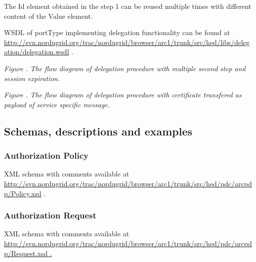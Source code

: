 \documentclass{article}
\newcommand\textstyleInternetlink[1]{\textcolor[rgb]{0.0,0.0,0.5019608}{#1}}
\newcounter{Figure}
\renewcommand\theFigure{\arabic{Figure}}
\begin{document}
{\color{black}
The Id element obtained in the step 1 can be reused multiple times with
different content of the Value element.}

{\color{black}
WSDL of portType implementing delegation functionality can be found at
\url{http://svn.nordugrid.org/trac/nordugrid/browser/arc1/trunk/src/hed/libs/delegation/delegation.wsdl}
.}

{\par}

{\centering{}\itshape\color{black}
Figure {\theFigure\label{seq:refFigure5}}. The
flow diagram of delegation procedure with multiple second step and
session expiration. 
\par}

{\par}

{\centering{}\itshape\color{black}
Figure {\theFigure\label{seq:refFigure6}}. The
flow diagram of delegation procedure with certificate transfered as
payload of service specific message. 
\par}

\subsection[Schemas, descriptions and examples]{Schemas, descriptions
and examples}
\subsubsection[Authorization Policy]{Authorization Policy}
\label{bkm:Ref204009564}{\upshape\color{black}
XML schema with comments available at
\url{http://svn.nordugrid.org/trac/nordugrid/browser/arc1/trunk/src/hed/pdc/arcpdp/Policy.xsd}
.}

\subsubsection[Authorization Request]{Authorization Request}
\label{bkm:Ref204009595}{\upshape\color{black}
XML schema with comments available at
\url{http://svn.nordugrid.org/trac/nordugrid/browser/arc1/trunk/src/hed/pdc/arcpdp/Request.xsd}\href{http://svn.nordugrid.org/trac/nordugrid/browser/arc1/trunk/src/hed/pdc/arcpdp/Policy.xsd}{\textstyleInternetlink{
.}}}
\end{document}

